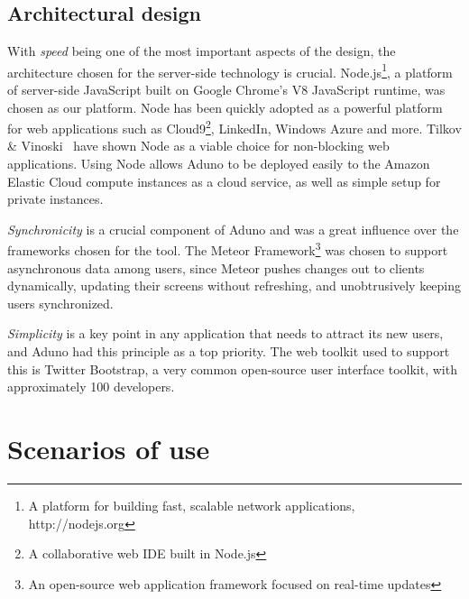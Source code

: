 \documentclass[conference]{IEEEtran}
\begin{document}

\subsection{Architectural design}
With \emph{speed} being one of the most important aspects of the design, the architecture chosen for the server-side technology is crucial.  Node.js\footnote{A platform for building fast, scalable network applications, http://nodejs.org}, a platform of server-side JavaScript built on Google Chrome's V8 JavaScript runtime, was chosen as our platform.  Node has been quickly adopted as a powerful platform for web applications such as Cloud9\footnote{A collaborative web IDE built in Node.js}, LinkedIn, Windows Azure and more.  Tilkov \& Vinoski~\cite{TV10} have shown Node as a viable choice for non-blocking web applications.  Using Node allows Aduno to be deployed easily to the Amazon Elastic Cloud compute instances as a cloud service, as well as simple setup for private instances.

\emph{Synchronicity} is a crucial component of Aduno and was a great influence over the frameworks chosen for the tool.  The Meteor Framework\footnote{An open-source web application framework focused on real-time updates} was chosen to support asynchronous data among users, since Meteor pushes changes out to clients dynamically, updating their screens without refreshing, and unobtrusively keeping users synchronized.  

\emph{Simplicity} is a key point in any application that needs to attract its new users, and Aduno had this principle as a top priority.  The web toolkit used to support this is Twitter Bootstrap, a very common open-source user interface toolkit, with approximately 100 developers.

\section{Scenarios of use}
\label{sec:scenarios}
\end{document}
